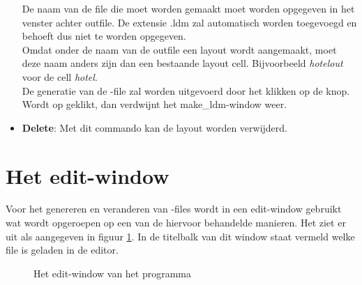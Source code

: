 \begin{itemize}
De naam van de file die moet worden gemaakt moet worden opgegeven in
het venster achter outfile. De extensie .ldm zal automatisch worden
toegevoegd en behoeft dus niet te worden opgegeven.\\
Omdat onder de naam van de outfile een layout wordt aangemaakt,
moet deze naam anders zijn dan een bestaande layout cell.
Bijvoorbeeld {\it hotelout} voor de cell {\it hotel}.\\
De generatie van de -file zal worden uitgevoerd door het klikken
op de  knop.\\
Wordt op  geklikt, dan verdwijnt het make\_ldm-window weer.
\item {\bf Delete}:
Met dit commando kan de layout worden verwijderd.
\end{itemize}

\section{Het  edit-window}
\label{edit-section}
Voor het genereren en veranderen van -files wordt in  een
edit-window gebruikt wat wordt opgeroepen op een van de hiervoor behandelde manieren.
Het ziet er uit als aangegeven in figuur \ref{edit-window}.
In de titelbalk van dit window staat vermeld welke file is geladen in de editor.

\begin{figure}[htb]
\centerline{}
\caption{Het edit-window van het programma }
\label{edit-window}
\end{figure}

